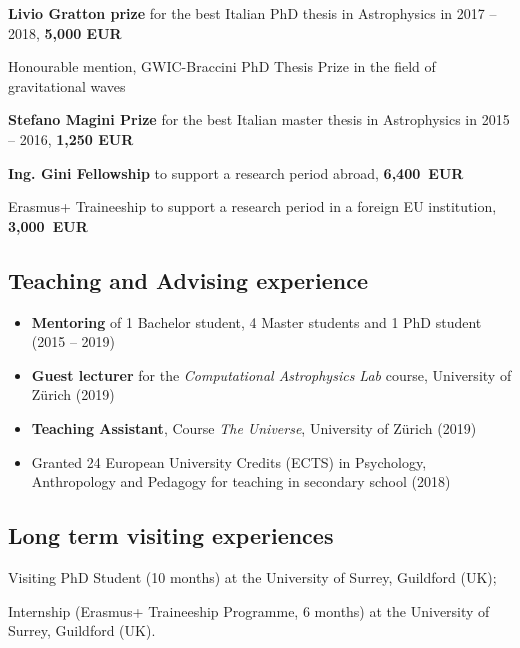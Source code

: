 \documentclass[11pt,a4paper]{article}
\begin{document}
\begin{description}
\setlength\itemsep{-2pt}

\item[\normalfont 2019:] \textbf{Livio Gratton prize} for the best Italian PhD thesis in Astrophysics in 2017 -- 2018, \textbf{5,000 EUR}

\item[\normalfont 2019:] {Honourable mention, GWIC-Braccini PhD Thesis Prize} in the field of gravitational waves

\item[\normalfont 2017:] \textbf{Stefano Magini Prize} for the best Italian master thesis in Astrophysics in 2015 -- 2016, \textbf{1,250 EUR}

\item[\normalfont 2016:] \textbf{Ing. Gini Fellowship} to support a research period abroad,  {\bf 6,400~EUR}

\item [\normalfont 2015:] {Erasmus+ Traineeship} to support a research period  in a foreign EU institution,  {\bf 3,000~EUR}

\end{description}

\subsection*{{Teaching and Advising experience}}
\begin{itemize}[leftmargin=3.5mm]
\setlength\itemsep{-2pt}
\item
\textbf{Mentoring} of 1 Bachelor student, 4 Master students and 1 PhD student (2015 -- 2019)
\item \textbf{Guest lecturer} for the  \textit{Computational Astrophysics Lab} course, University of Z\"urich (2019)
\item
\textbf{Teaching Assistant}, Course \textit{The Universe}, University of Z\"urich (2019)
\item Granted 24 European University Credits (ECTS)  in Psychology, Anthropology and
Pedagogy for teaching in secondary school (2018)
\end{itemize}


\subsection*{{Long term visiting experiences}}
\begin{description}
\setlength\itemsep{-2pt}
\item[\normalfont 2017:] {Visiting PhD Student} (10 months) at the {University of Surrey}, Guildford (UK);
\item[\normalfont 2015:] {Internship} (Erasmus+ Traineeship Programme, 6 months) at the {University of Surrey}, Guildford (UK).
\end{description}
\end{document}

